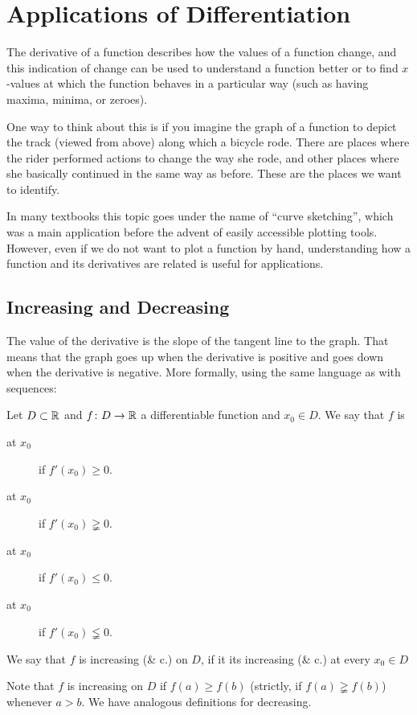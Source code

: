 \chapter{Applications of Differentiation}
\label{chappdiff}

The derivative of a function describes how the values of a function change,
and this indication of change can be used to understand a function better or
to find $x$-values at which the function behaves in a particular way (such
as having maxima, minima, or zeroes).

One way to think about this is if you imagine the graph of a function to
depict the track (viewed from above) along which a bicycle rode.
There are places where the rider performed actions to change the way she
rode, and other places where she basically continued in the same way as
before. These are the places we want to identify.

In many textbooks this topic goes under the name of ``curve sketching'',
which was a main application before the advent of easily accessible plotting
tools. However, even if we do not want to plot a function by hand,
understanding how a function and its derivatives are related is useful for
applications.

\section{Increasing and Decreasing}
\label{secincr}

The value of the derivative is the slope of the tangent line to the graph.
That means that the graph goes up
when the derivative is positive and goes down
when the derivative is negative. More formally, using the same language as
with sequences:
\begin{defn}
Let $D\subset{\mathbb R}$ and $f\colon D\to{\mathbb R}$ a differentiable function and $x_0\in
D$. We say that $f$ is
\begin{description}
\item[ at $x_0$] if $f'(x_0)\ge 0$.
\item[ at $x_0$] if $f'(x_0)\gneqq 0$.
\item[ at $x_0$] if $f'(x_0)\le 0$.
\item[ at $x_0$] if $f'(x_0)\lneqq 0$.
\end{description}
We say that $f$ is increasing (\& c.) on $D$, if it its increasing
(\& c.) at every $x_0\in D$
\end{defn}
Note that $f$ is increasing on $D$ if $f(a)\ge f(b)$ (strictly, if
$f(a)\gneqq f(b)$) whenever $a>b$. We have analogous definitions for
decreasing. 


